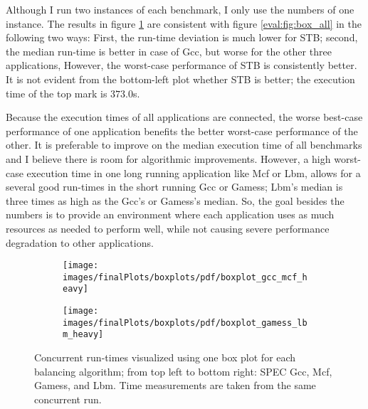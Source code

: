 Although I run two instances of each benchmark, I only use the numbers of one
instance.
The results in figure \ref{eval:fig:box_heavy} are consistent with figure
\ref{eval:fig:box_all} in the following two ways:
First, the run-time deviation is much lower for STB; second, the median
run-time is better in case of Gcc, but worse for the other three applications,
However, the worst-case performance of STB is consistently better.
It is not evident from the bottom-left plot whether STB is better; the
execution time of the top mark is $373.0$s.

Because the execution times of all applications are connected, the worse
best-case performance of one application benefits the better worst-case
performance of the other.
It is preferable to improve on the median execution time of all benchmarks and
I believe there is room for algorithmic improvements.
However, a high worst-case execution time in one long running application like
Mcf or Lbm, allows for a
several good run-times in the short running Gcc or Gamess; Lbm's median is
three times as high as the Gcc's or Gamess's median.
So, the goal besides the numbers is to provide an environment where each
application uses as much resources as needed to perform well, while not causing
severe performance degradation to other applications.
%
\begin{figure}[h!]
  \begin{subfigure}{\textwidth}
  \texttt{[image: images/finalPlots/boxplots/pdf/boxplot\_gcc\_mcf\_heavy]}
  \end{subfigure}
  \begin{subfigure}{\textwidth}
  \texttt{[image: images/finalPlots/boxplots/pdf/boxplot\_gamess\_lbm\_heavy]}
  \end{subfigure}
  \caption{Concurrent run-times visualized using one box plot for each balancing
    algorithm; from top left to bottom right: SPEC Gcc, Mcf, Gamess, and Lbm.
    Time measurements are taken from the same concurrent run.}
    \label{eval:fig:box_heavy}
\end{figure}

